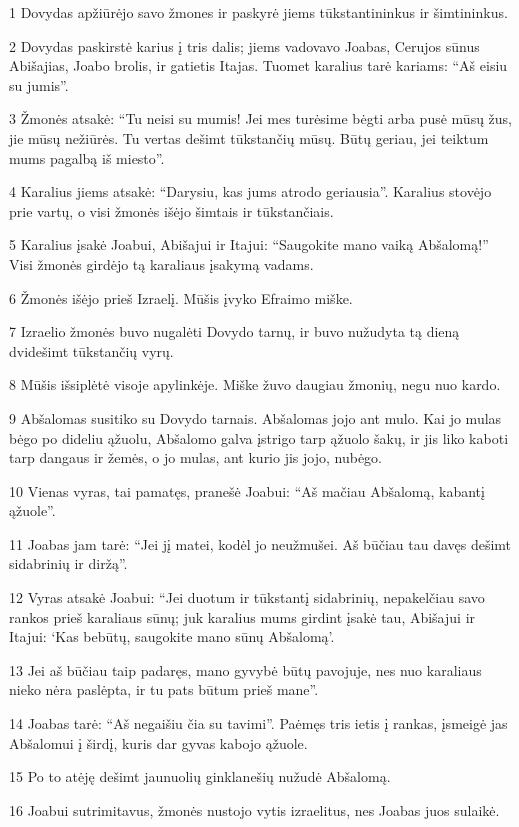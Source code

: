 \par 1 Dovydas apžiūrėjo savo žmones ir paskyrė jiems tūkstantininkus ir šimtininkus. 
\par 2 Dovydas paskirstė karius į tris dalis; jiems vadovavo Joabas, Cerujos sūnus Abišajias, Joabo brolis, ir gatietis Itajas. Tuomet karalius tarė kariams: “Aš eisiu su jumis”. 
\par 3 Žmonės atsakė: “Tu neisi su mumis! Jei mes turėsime bėgti arba pusė mūsų žus, jie mūsų nežiūrės. Tu vertas dešimt tūkstančių mūsų. Būtų geriau, jei teiktum mums pagalbą iš miesto”. 
\par 4 Karalius jiems atsakė: “Darysiu, kas jums atrodo geriausia”. Karalius stovėjo prie vartų, o visi žmonės išėjo šimtais ir tūkstančiais. 
\par 5 Karalius įsakė Joabui, Abišajui ir Itajui: “Saugokite mano vaiką Abšalomą!” Visi žmonės girdėjo tą karaliaus įsakymą vadams. 
\par 6 Žmonės išėjo prieš Izraelį. Mūšis įvyko Efraimo miške. 
\par 7 Izraelio žmonės buvo nugalėti Dovydo tarnų, ir buvo nužudyta tą dieną dvidešimt tūkstančių vyrų. 
\par 8 Mūšis išsiplėtė visoje apylinkėje. Miške žuvo daugiau žmonių, negu nuo kardo. 
\par 9 Abšalomas susitiko su Dovydo tarnais. Abšalomas jojo ant mulo. Kai jo mulas bėgo po dideliu ąžuolu, Abšalomo galva įstrigo tarp ąžuolo šakų, ir jis liko kaboti tarp dangaus ir žemės, o jo mulas, ant kurio jis jojo, nubėgo. 
\par 10 Vienas vyras, tai pamatęs, pranešė Joabui: “Aš mačiau Abšalomą, kabantį ąžuole”. 
\par 11 Joabas jam tarė: “Jei jį matei, kodėl jo neužmušei. Aš būčiau tau davęs dešimt sidabrinių ir diržą”. 
\par 12 Vyras atsakė Joabui: “Jei duotum ir tūkstantį sidabrinių, nepakelčiau savo rankos prieš karaliaus sūnų; juk karalius mums girdint įsakė tau, Abišajui ir Itajui: ‘Kas bebūtų, saugokite mano sūnų Abšalomą’. 
\par 13 Jei aš būčiau taip padaręs, mano gyvybė būtų pavojuje, nes nuo karaliaus nieko nėra paslėpta, ir tu pats būtum prieš mane”. 
\par 14 Joabas tarė: “Aš negaišiu čia su tavimi”. Paėmęs tris ietis į rankas, įsmeigė jas Abšalomui į širdį, kuris dar gyvas kabojo ąžuole. 
\par 15 Po to atėję dešimt jaunuolių ginklanešių nužudė Abšalomą. 
\par 16 Joabui sutrimitavus, žmonės nustojo vytis izraelitus, nes Joabas juos sulaikė. 
